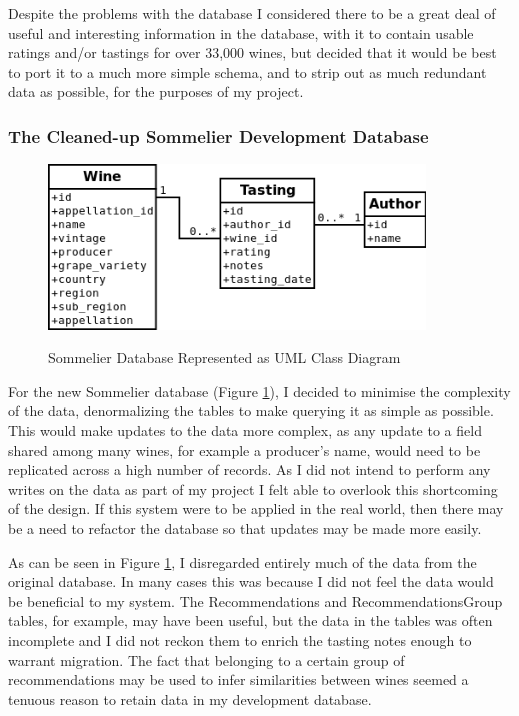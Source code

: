 Despite the problems with the database I considered there to be a great deal of useful and interesting information in the database, with it to contain usable ratings and/or tastings for over 33,000 wines, but decided that it would be best to port it to a much more simple schema, and to strip out as much redundant data as possible, for the purposes of my project.

\subsubsection{The Cleaned-up Sommelier Development Database}

\begin{figure}[h!]
    \caption{Sommelier Database Represented as UML Class Diagram}
    \centering
        \includegraphics[width=10cm]{SommelierDBSimple}
    \label{fig:sommelierdb}
\end{figure}

For the new Sommelier database (Figure \ref{fig:sommelierdb}), I decided to minimise the complexity of the data, denormalizing the tables to make querying it as simple as possible. This would make updates to the data more complex, as any update to a field shared among many wines, for example a producer's name, would need to be replicated across a high number of records. As I did not intend to perform any writes on the data as part of my project I felt able to overlook this shortcoming of the design. If this system were to be applied in the real world, then there may be a need to refactor the database so that updates may be made more easily. 

As can be seen in Figure \ref{fig:sommelierdb}, I disregarded entirely much of the data from the original database. In many cases this was because I did not feel the data would be beneficial to my system. The Recommendations and RecommendationsGroup tables, for example, may have been useful, but the data in the tables was often incomplete and I did not reckon them to enrich the tasting notes enough to warrant migration. The fact that belonging to a certain group of recommendations may be used to infer similarities between wines seemed a tenuous reason to retain data in my development database.

